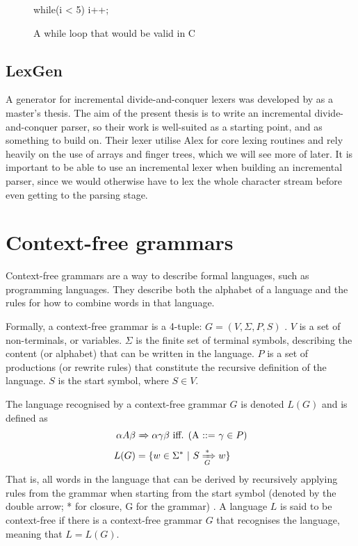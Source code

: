 \documentclass[a4paper,12pt,notitlepage]{report}
\renewcommand\cite{\citep}
\begin{document}
\begin{figure}[H]
\begin{code}
while(i < 5) {
    i++;
}
\end{code}
\caption{A while loop that would be valid in C}
\label{lexsample}
\end{figure}

\subsection{LexGen}
A generator for incremental divide-and-conquer lexers was developed by
\citet{divconqlex} as a master's thesis. The aim of the present thesis is to
write an incremental divide-and-conquer parser, so their work is well-suited as
a starting point, and as something to build on. Their lexer utilise Alex
\cite{alex} for core lexing routines and rely heavily on the use of arrays and
finger trees, which we will see more of later. It is important to be able to use
an incremental lexer when building an incremental parser, since we would
otherwise have to lex the whole character stream before even getting to the
parsing stage.

\section{Context-free grammars}
Context-free grammars are a way to describe formal languages, such as
programming languages. They describe both the alphabet of a language and the
rules for how to combine words in that language.

Formally, a context-free grammar is a 4-tuple: $G = (V, \Sigma, P, S)$
\cite[p.171]{automatabook}. $V$ is a set of non-terminals, or variables. $\Sigma$ is
the finite set of terminal symbols, describing the content (or alphabet) that
can be written in the language. $P$ is a set of productions (or rewrite rules)
that constitute the recursive definition of the language. $S$ is the start
symbol, where $S \in V$. 

The language recognised by a context-free grammar $G$ is denoted $L(G)$ and is
defined as 
\begin{align*}
\alpha A \beta & \xRightarrow\ \alpha \gamma \beta \text{ iff. (A ::= }\gamma \in P) \\
L(G) &= \{w \in \Sigma^* \ |\  S \xRightarrow[G]{*} w\}
\end{align*}
That is, all words in the language that can be derived by recursively applying
rules from the grammar when starting from the start symbol (denoted by the
double arrow; * for closure, G for the grammar) \cite[p.  177]{automatabook}. A
language $L$ is said to be context-free if there is a context-free grammar $G$
that recognises the language, meaning that $L = L(G)$.
\end{document}
